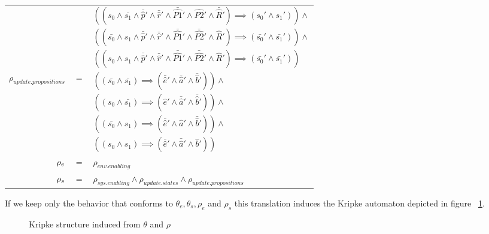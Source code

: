 \begin{tabular}{ r c l }
	&&$((s_0 \wedge \bar{s_1} \wedge \bar{\hat{p}}' \wedge \bar{\hat{r}}' \wedge \bar{\hat{P1}}'\wedge \hat{P2}' \wedge \bar{\hat{R}}') \implies (s_0' \wedge s_1')) \wedge$\\		
	&&$((\bar{s_0} \wedge s_1 \wedge \bar{\hat{p}}' \wedge \bar{\hat{r}}' \wedge \bar{\hat{P1}}' \wedge \bar{\hat{P2}}' \wedge \hat{R}')\implies (\bar{s_0}' \wedge \bar{s_1}')) \wedge$\\		
	&&$((s_0 \wedge s_1 \wedge \bar{\hat{p}}' \wedge \bar{\hat{r}}' \wedge \bar{\hat{P1}}' \wedge \bar{\hat{P2}}' \wedge \hat{R}')\implies (\bar{s_0}' \wedge \bar{s_1}'))$\\			
	$\rho_{update.propositions}$ &$=$& $((\bar{s_0} \wedge \bar{s_1}) \implies (\bar{\hat{e}}' \wedge \bar{\hat{a}}' \wedge \bar{\hat{b}}')) \wedge$\\
	&& $((s_0 \wedge \bar{s_1}) \implies (\hat{e}' \wedge \bar{\hat{a}}' \wedge \bar{\hat{b}}')) \wedge$\\
	&& $((\bar{s_0} \wedge s_1) \implies (\bar{\hat{e}}' \wedge \hat{a}' \wedge \bar{\hat{b}}')) \wedge$\\
	&& $((s_0 \wedge s_1) \implies (\bar{\hat{e}}' \wedge \bar{\hat{a}}' \wedge \hat{b}'))$\\	
	${\rho_e}$&$=$&$\rho_{env.enabling}$\\		
	${\rho_s}$&$=$&$\rho_{sys.enabling} \wedge  \rho_{update.states} \wedge  \rho_{update.propositions}$\\	
\end{tabular}
\vspace{1em}
\normalsize

If we keep only the behavior that conforms to $\theta_e, \theta_s, \rho_e$ and $\rho_s$ this translation induces the Kripke automaton depicted in figure ~\ref{fig:clts_to_fds_K}.

\begin{figure}[bt]
	\centering
	\caption{Kripke structure induced from $\theta$ and $\rho$}
	\label{fig:clts_to_fds_K}
\end{figure}

